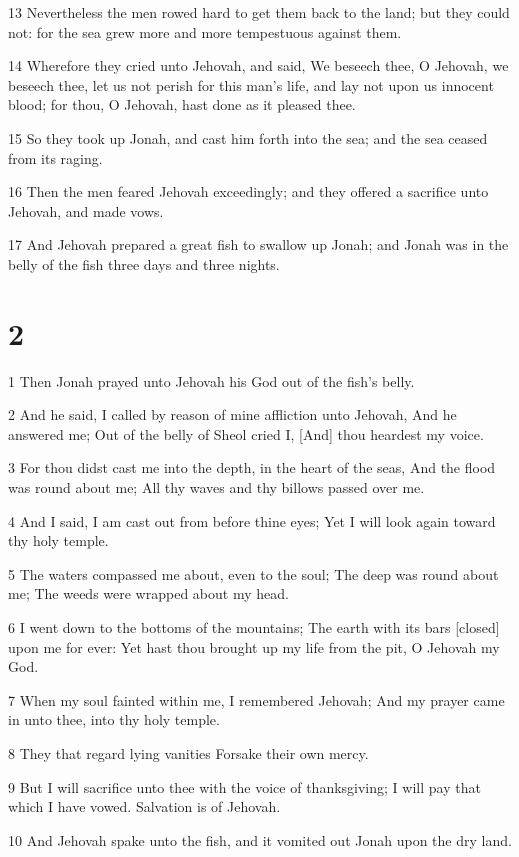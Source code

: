 \par 13 Nevertheless the men rowed hard to get them back to the land; but they could not: for the sea grew more and more tempestuous against them.
\par 14 Wherefore they cried unto Jehovah, and said, We beseech thee, O Jehovah, we beseech thee, let us not perish for this man's life, and lay not upon us innocent blood; for thou, O Jehovah, hast done as it pleased thee.
\par 15 So they took up Jonah, and cast him forth into the sea; and the sea ceased from its raging.
\par 16 Then the men feared Jehovah exceedingly; and they offered a sacrifice unto Jehovah, and made vows.
\par 17 And Jehovah prepared a great fish to swallow up Jonah; and Jonah was in the belly of the fish three days and three nights.

\chapter{2}

\par 1 Then Jonah prayed unto Jehovah his God out of the fish's belly.
\par 2 And he said, I called by reason of mine affliction unto Jehovah, And he answered me; Out of the belly of Sheol cried I, [And] thou heardest my voice.
\par 3 For thou didst cast me into the depth, in the heart of the seas, And the flood was round about me; All thy waves and thy billows passed over me.
\par 4 And I said, I am cast out from before thine eyes; Yet I will look again toward thy holy temple.
\par 5 The waters compassed me about, even to the soul; The deep was round about me; The weeds were wrapped about my head.
\par 6 I went down to the bottoms of the mountains; The earth with its bars [closed] upon me for ever: Yet hast thou brought up my life from the pit, O Jehovah my God.
\par 7 When my soul fainted within me, I remembered Jehovah; And my prayer came in unto thee, into thy holy temple.
\par 8 They that regard lying vanities Forsake their own mercy.
\par 9 But I will sacrifice unto thee with the voice of thanksgiving; I will pay that which I have vowed. Salvation is of Jehovah.
\par 10 And Jehovah spake unto the fish, and it vomited out Jonah upon the dry land.

